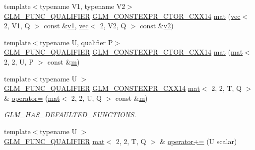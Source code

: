 \begin{DoxyCompactItemize}
\item 
{\footnotesize template$<$typename V1, typename V2$>$ }\\\hyperlink{setup_8hpp_a33fdea6f91c5f834105f7415e2a64407}{G\+L\+M\+\_\+\+F\+U\+N\+C\+\_\+\+Q\+U\+A\+L\+I\+F\+I\+ER} \hyperlink{setup_8hpp_a0900f9145e68bf6061b6f5e7be3fa751}{G\+L\+M\+\_\+\+C\+O\+N\+S\+T\+E\+X\+P\+R\+\_\+\+C\+T\+O\+R\+\_\+\+C\+X\+X14} \hyperlink{structglm_1_1mat_3_012_00_012_00_01_t_00_01_q_01_4_a57de0b97d240ad056c3aa54425eb8244}{mat} (\hyperlink{structglm_1_1vec}{vec}$<$ 2, V1, Q $>$ const \&\hyperlink{_s_d_l__opengl__glext_8h_a435c176a02c061b43e19bdf7c86cceae}{v1}, \hyperlink{structglm_1_1vec}{vec}$<$ 2, V2, Q $>$ const \&\hyperlink{_s_d_l__opengl__glext_8h_a0928f6d0f0f794ba000a21dfae422136}{v2})
\item 
{\footnotesize template$<$typename U, qualifier P$>$ }\\\hyperlink{setup_8hpp_a33fdea6f91c5f834105f7415e2a64407}{G\+L\+M\+\_\+\+F\+U\+N\+C\+\_\+\+Q\+U\+A\+L\+I\+F\+I\+ER} \hyperlink{setup_8hpp_a0900f9145e68bf6061b6f5e7be3fa751}{G\+L\+M\+\_\+\+C\+O\+N\+S\+T\+E\+X\+P\+R\+\_\+\+C\+T\+O\+R\+\_\+\+C\+X\+X14} \hyperlink{structglm_1_1mat_3_012_00_012_00_01_t_00_01_q_01_4_a93387113fa262d6612cc51c980056241}{mat} (\hyperlink{structglm_1_1mat}{mat}$<$ 2, 2, U, P $>$ const \&\hyperlink{_s_d_l__opengl__glext_8h_af593500c283bf1a787a6f947f503a5c2}{m})
\item 
{\footnotesize template$<$typename U $>$ }\\\hyperlink{setup_8hpp_a33fdea6f91c5f834105f7415e2a64407}{G\+L\+M\+\_\+\+F\+U\+N\+C\+\_\+\+Q\+U\+A\+L\+I\+F\+I\+ER} \hyperlink{setup_8hpp_a4dd12abf5e1164bc57f3a34671d03844}{G\+L\+M\+\_\+\+C\+O\+N\+S\+T\+E\+X\+P\+R\+\_\+\+C\+X\+X14} \hyperlink{structglm_1_1mat}{mat}$<$ 2, 2, T, Q $>$ \& \hyperlink{structglm_1_1mat_3_012_00_012_00_01_t_00_01_q_01_4_a1819564bc86b8cc5a855482bdfcb88d7}{operator=} (\hyperlink{structglm_1_1mat}{mat}$<$ 2, 2, U, Q $>$ const \&\hyperlink{_s_d_l__opengl__glext_8h_af593500c283bf1a787a6f947f503a5c2}{m})
\begin{DoxyCompactList}\small\item\em G\+L\+M\+\_\+\+H\+A\+S\+\_\+\+D\+E\+F\+A\+U\+L\+T\+E\+D\+\_\+\+F\+U\+N\+C\+T\+I\+O\+NS. \end{DoxyCompactList}\item 
{\footnotesize template$<$typename U $>$ }\\\hyperlink{setup_8hpp_a33fdea6f91c5f834105f7415e2a64407}{G\+L\+M\+\_\+\+F\+U\+N\+C\+\_\+\+Q\+U\+A\+L\+I\+F\+I\+ER} \hyperlink{structglm_1_1mat}{mat}$<$ 2, 2, T, Q $>$ \& \hyperlink{structglm_1_1mat_3_012_00_012_00_01_t_00_01_q_01_4_a989c77fac3c3679eb4dd7fdece75d179}{operator+=} (U scalar)

\end{DoxyCompactItemize}
